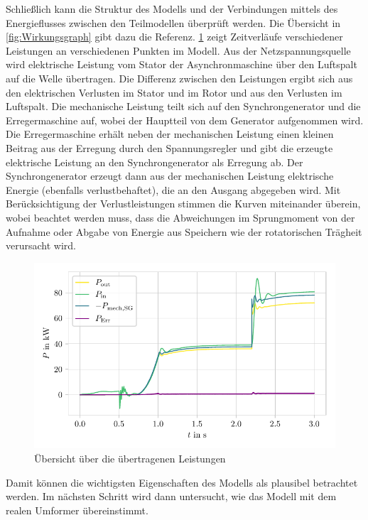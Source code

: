 Schließlich kann die Struktur des Modells und der Verbindungen mittels des Energie\-flusses zwischen den Teilmodellen überprüft werden. Die Übersicht in \cref{fig:Wirkungsgraph} gibt dazu die Referenz. \cref{fig:VerifikationLeistungen} zeigt Zeitverläufe verschiedener Leistungen an verschiedenen Punkten im Modell. Aus der Netzspannungsquelle wird elektrische Leistung vom Stator der Asynchronmaschine über den Luftspalt auf die Welle übertragen. Die Differenz zwischen den Leistungen ergibt sich aus den elektrischen Verlusten im Stator und im Rotor und aus den Verlusten im Luftspalt. Die mechanische Leistung teilt sich auf den Synchrongenerator und die Erregermaschine auf, wobei der Hauptteil von dem Generator aufgenommen wird. Die Erregermaschine erhält neben der mechanischen Leistung einen kleinen Beitrag aus der Erregung durch den Spannungsregler und gibt die erzeugte elektrische Leistung an den Synchrongenerator als Erregung ab. Der Synchrongenerator erzeugt dann aus der mechanischen Leistung elektrische Energie (ebenfalls verlustbehaftet), die an den Ausgang abgegeben wird. Mit Berücksichtigung der Verlustleistungen stimmen die Kurven miteinander überein, wobei beachtet werden muss, dass die Abweichungen im Sprungmoment von der Aufnahme oder Abgabe von Energie aus Speichern wie der rotatorischen Trägheit verursacht wird.
\begin{figure}
    \centering
    \includegraphics{Bilder/Verifikation_Leistung.pdf}
    \caption{Übersicht über die übertragenen Leistungen}
    \label{fig:VerifikationLeistungen}
\end{figure}

Damit können die wichtigsten Eigenschaften des Modells als plausibel betrachtet werden. Im nächsten Schritt wird dann untersucht, wie das Modell mit dem realen Umformer übereinstimmt.

